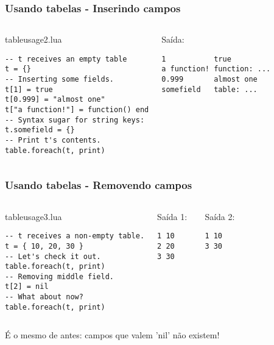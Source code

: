 \documentclass[brazil]{beamer}
\begin{document}
\begin{frame}[fragile]
  \frametitle{Usando tabelas - Inserindo campos}
  \pause
  \begin{columns}
      \begin{block}{tableusage2.lua}
        \begin{lstlisting}
-- t receives an empty table
t = {}
-- Inserting some fields.
t[1] = true
t[0.999] = "almost one"
t["a function!"] = function() end
-- Syntax sugar for string keys:
t.somefield = {}
-- Print t's contents.
table.foreach(t, print)
        \end{lstlisting}
      \end{block}
    \pause
      \begin{block}{Saída:}
        \begin{verbatim}
1           true
a function! function: ...
0.999       almost one
somefield   table: ...    \end{verbatim}
      \end{block}
  \end{columns}
\end{frame}


\begin{frame}[fragile]
  \frametitle{Usando tabelas - Removendo campos}
  \pause
  \begin{columns}
      \begin{block}{tableusage3.lua}
        \begin{lstlisting}
-- t receives a non-empty table.
t = { 10, 20, 30 }
-- Let's check it out.
table.foreach(t, print)
-- Removing middle field.
t[2] = nil
-- What about now?
table.foreach(t, print)
        \end{lstlisting}
      \end{block}
    \pause
      \begin{block}{Saída 1:}
        \begin{verbatim}
1 10
2 20
3 30    \end{verbatim}
      \end{block}
      \begin{block}{Saída 2:}
        \begin{verbatim}
1 10
3 30    \end{verbatim}
      \end{block}
  \end{columns}
  \pause
  \begin{center}
    É o mesmo de antes: campos que valem 'nil' não existem!
  \end{center}
\end{frame}
\end{document}
